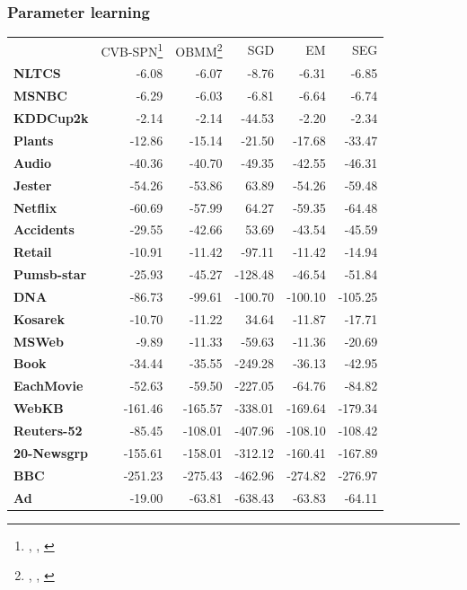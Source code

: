 \documentclass[10pt, t, xcolor={usenames,dvipsnames,svgnames}, compress]{beamer}
\newcommand{\customcite}[1]{\footnote{\scriptsize \citeauthor{#1}, \citetitle{#1}, \citeyear{#1}}}
\begin{document}
\begin{frame}[t]
  \frametitle{Parameter learning}
  \begin{table}
    \centering
    \scriptsize
    \setlength{\tabcolsep}{3pt}  
    \begin{tabular}{l r r r r r}
      & \textsf{CVB-SPN}\customcite{Zhao2016a} & \textsf{OBMM}\customcite{Rashwan2016} & \textsf{SGD}\footnotemark[48] & \textsf{EM}\footnotemark[48] & \textsf{SEG}\footnotemark[48] \\
      \textbf{NLTCS}      & -6.08   & -6.07   & -8.76   & -6.31   & -6.85   \\
      \textbf{MSNBC}      & -6.29   & -6.03   & -6.81   & -6.64   & -6.74   \\
      \textbf{KDDCup2k}   & -2.14   & -2.14   & -44.53  & -2.20   & -2.34   \\
      \textbf{Plants}     & -12.86  & -15.14  & -21.50  & -17.68  & -33.47  \\
      \textbf{Audio}      & -40.36  & -40.70  & -49.35  & -42.55  & -46.31  \\
      \textbf{Jester}     & -54.26  & -53.86  & 63.89   & -54.26  & -59.48  \\
      \textbf{Netflix}    & -60.69  & -57.99  & 64.27   & -59.35  & -64.48  \\
      \textbf{Accidents}  & -29.55  & -42.66  & 53.69   & -43.54  & -45.59  \\
      \textbf{Retail}     & -10.91  & -11.42  & -97.11  & -11.42  & -14.94  \\
      \textbf{Pumsb-star} & -25.93  & -45.27  & -128.48 & -46.54  & -51.84  \\
      \textbf{DNA}        & -86.73  & -99.61  & -100.70 & -100.10 & -105.25 \\
      \textbf{Kosarek}    & -10.70  & -11.22  & 34.64   & -11.87  & -17.71  \\
      \textbf{MSWeb}      & -9.89   & -11.33  & -59.63  & -11.36  & -20.69  \\
      \textbf{Book}       & -34.44  & -35.55  & -249.28 & -36.13  & -42.95  \\
      \textbf{EachMovie}  & -52.63  & -59.50  & -227.05 & -64.76  & -84.82  \\
      \textbf{WebKB}      & -161.46 & -165.57 & -338.01 & -169.64 & -179.34 \\
      \textbf{Reuters-52} & -85.45  & -108.01 & -407.96 & -108.10 & -108.42 \\
      \textbf{20-Newsgrp} & -155.61 & -158.01 & -312.12 & -160.41 & -167.89 \\
      \textbf{BBC}        & -251.23 & -275.43 & -462.96 & -274.82 & -276.97 \\
      \textbf{Ad}         & -19.00  & -63.81  & -638.43 & -63.83  & -64.11  \\
    \end{tabular}
    \label{tab:model-accs}
  \end{table}

\end{frame}
\end{document}
